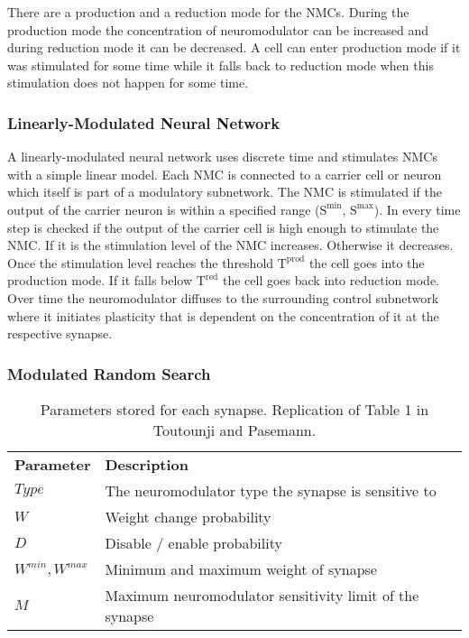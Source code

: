 \documentclass[12pt,twoside]{scrartcl}
\theoremstyle{plain}
\theoremstyle{definition}
\theoremstyle{remark}
\begin{document}
There are a production and a reduction mode for the NMCs. During the production
mode the concentration of neuromodulator can be increased and during reduction
mode it can be decreased. A cell can enter production mode if it was stimulated
for some time while it falls back to reduction mode when this stimulation
does not happen for some time.

\subsubsection*{Linearly-Modulated Neural Network}

A linearly-modulated neural network uses discrete time and stimulates NMCs
with a simple linear model. Each NMC is connected to a carrier cell or neuron
which itself is part of a modulatory subnetwork. The NMC is stimulated if the
output of the carrier neuron is within a specified range
(\(\text{S}^{\text{min}}\), \(\text{S}^{\text{max}}\)). In every time step
is checked if the output of the carrier cell is high enough to stimulate the
NMC. If it is the stimulation level of the NMC increases. Otherwise it decreases.
Once the stimulation level reaches the threshold \(\text{T}^{\text{prod}}\)
the cell goes into the production mode. If it falls below \(\text{T}^{\text{red}}\)
the cell goes back into reduction mode.
Over time the neuromodulator diffuses to the surrounding control subnetwork
where it initiates plasticity that is dependent on the concentration of it at
the respective synapse.

\subsubsection*{Modulated Random Search}

\begin{table}
    \begin{tabular}{l|l}
        \textbf{Parameter} & \textbf{Description} \\
        \(Type\) & The neuromodulator type the synapse is sensitive to \\
        \(W\) & Weight change probability \\
        \(D\) & Disable / enable probability \\
        \(W^{min}, W^{max}\) & Minimum and maximum weight of synapse \\
        \(M\) & Maximum neuromodulator sensitivity limit of the synapse
    \end{tabular}
    \caption{Parameters stored for each synapse.
    Replication of Table 1 in Toutounji and Pasemann\cite{Toutounji2016}.}
    \label{tab:mrs-synapse}
\end{table}
\end{document}

